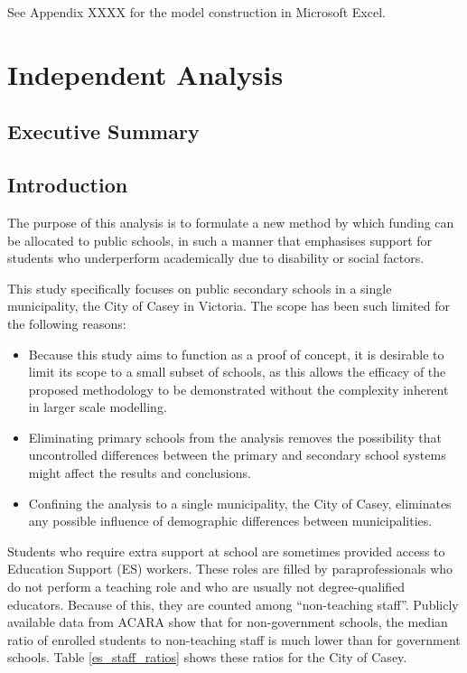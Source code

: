 \documentclass[11pt, a4paper]{article}
\begin{document}
    See Appendix XXXX for the model construction in Microsoft Excel.

    \newpage

    \section{Independent Analysis}

    \subsection{Executive Summary}



    \subsection{Introduction}

    The purpose of this analysis is to formulate a new method by which funding can be allocated to public schools, in such a manner that emphasises support for students who underperform academically due to disability or social factors. 
    
    This study specifically focuses on public secondary schools in a single municipality, the City of Casey in Victoria. The scope has been such limited for the following reasons:

    \begin{itemize}
        \item Because this study aims to function as a proof of concept, it is desirable to limit its scope to a small subset of schools, as this allows the efficacy of the proposed methodology to be demonstrated without the complexity inherent in larger scale modelling.
        \item Eliminating primary schools from the analysis removes the possibility that uncontrolled differences between the primary and secondary school systems might affect the results and conclusions.
        \item Confining the analysis to a single municipality, the City of Casey, eliminates any possible influence of demographic differences between municipalities.  
    \end{itemize}

    Students who require extra support at school are sometimes provided access to Education Support (ES) workers. These roles are filled by paraprofessionals who do not perform a teaching role and who are usually not degree-qualified educators. Because of this, they are counted among ``non-teaching staff''. Publicly available data from ACARA \parencite{acara_profiles} show that for non-government schools, the median ratio of enrolled students to non-teaching staff is much lower than for government schools. Table \ref{es_staff_ratios} shows these ratios for the City of Casey.
\end{document}
